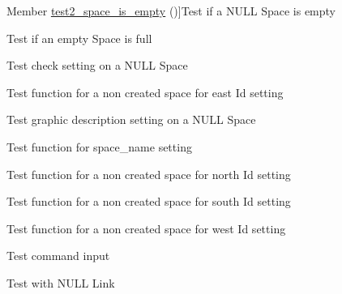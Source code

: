 \begin{DoxyRefList}
\hypertarget{test__test000256}{}%
Member \hyperlink{space__test_8h_ab37dd2227cdf35c7cf00b5cfc5f15cc9}{test2\+\_\+space\+\_\+is\+\_\+empty} ()]Test if a N\+U\+LL Space is empty  
\item[\label{test__test000259}%
\hypertarget{test__test000259}{}%
Member \hyperlink{space__test_8h_a58fa377888060f04809b114577dddd8e}{test2\+\_\+space\+\_\+is\+\_\+full} ()]Test if an empty Space is full  
\item[\label{test__test000229}%
\hypertarget{test__test000229}{}%
Member \hyperlink{space__test_8h_a48cfb4cb3e2f0c84402036a2be982a6b}{test2\+\_\+space\+\_\+set\+\_\+check} ()]Test check setting on a N\+U\+LL Space  
\item[\label{test__test000222}%
\hypertarget{test__test000222}{}%
Member \hyperlink{space__test_8h_a5df66d103388be4518c379b224f53770}{test2\+\_\+space\+\_\+set\+\_\+east} ()]Test function for a non created space for east Id setting  
\item[\label{test__test000226}%
\hypertarget{test__test000226}{}%
Member \hyperlink{space__test_8h_aff1a4a8818b4f4bfcfd65c2f04cd060a}{test2\+\_\+space\+\_\+set\+\_\+graphic\+\_\+description} ()]Test graphic description setting on a N\+U\+LL Space  
\item[\label{test__test000215}%
\hypertarget{test__test000215}{}%
Member \hyperlink{space__test_8h_a5a868ba017602ba6b58447cb394e81a6}{test2\+\_\+space\+\_\+set\+\_\+name} ()]Test function for space\+\_\+name setting  
\item[\label{test__test000218}%
\hypertarget{test__test000218}{}%
Member \hyperlink{space__test_8h_a3bc7fe26c1e36ffd195099a9983206e1}{test2\+\_\+space\+\_\+set\+\_\+north} ()]Test function for a non created space for north Id setting  
\item[\label{test__test000220}%
\hypertarget{test__test000220}{}%
Member \hyperlink{space__test_8h_ac9f950741f12ccfcc5ad5d9e71d3d90a}{test2\+\_\+space\+\_\+set\+\_\+south} ()]Test function for a non created space for south Id setting  
\item[\label{test__test000224}%
\hypertarget{test__test000224}{}%
Member \hyperlink{space__test_8h_aa51b05ffd99b7bbd8f2dfc23c8f85870}{test2\+\_\+space\+\_\+set\+\_\+west} ()]Test function for a non created space for west Id setting  
\item[\label{test__test000006}%
\hypertarget{test__test000006}{}%
Member \hyperlink{command__test_8h_ae2d4b758fa9767317795c822b7334dec}{test3\+\_\+command\+\_\+get\+\_\+user\+\_\+input} ()]Test command input  
\item[\label{test__test000087}%
\hypertarget{test__test000087}{}%
Member \hyperlink{game__test_8h_af97f3fbab50d8122acc5b2632c9a27cb}{test3\+\_\+game\+\_\+add\+\_\+link} ()]Test with N\+U\+LL Link 


\end{DoxyRefList}
